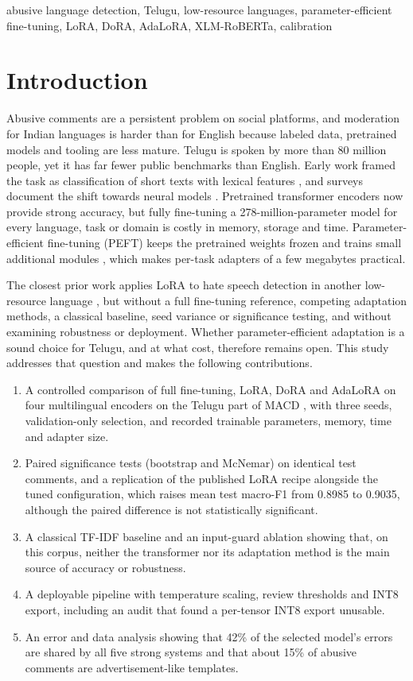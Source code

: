 \documentclass[conference]{IEEEtran}
\begin{document}
\begin{IEEEkeywords}
abusive language detection, Telugu, low-resource languages, parameter-efficient fine-tuning, LoRA, DoRA, AdaLoRA, XLM-RoBERTa, calibration
\end{IEEEkeywords}

\section{Introduction}
Abusive comments are a persistent problem on social platforms, and moderation for Indian languages is harder than for English because labeled data, pretrained models and tooling are less mature. Telugu is spoken by more than 80 million people, yet it has far fewer public benchmarks than English. Early work framed the task as classification of short texts with lexical features \cite{waseem2016,davidson2017}, and surveys document the shift towards neural models \cite{schmidt2017}. Pretrained transformer encoders \cite{vaswani2017,devlin2019bert} now provide strong accuracy, but fully fine-tuning a 278-million-parameter model for every language, task or domain is costly in memory, storage and time. Parameter-efficient fine-tuning (PEFT) keeps the pretrained weights frozen and trains small additional modules \cite{houlsby2019,hu2022lora}, which makes per-task adapters of a few megabytes practical.

The closest prior work applies LoRA to hate speech detection in another low-resource language \cite{kaunang2026indo}, but without a full fine-tuning reference, competing adaptation methods, a classical baseline, seed variance or significance testing, and without examining robustness or deployment. Whether parameter-efficient adaptation is a sound choice for Telugu, and at what cost, therefore remains open. This study addresses that question and makes the following contributions.
\begin{enumerate}
\item A controlled comparison of full fine-tuning, LoRA, DoRA and AdaLoRA on four multilingual encoders on the Telugu part of MACD \cite{gupta2022macd}, with three seeds, validation-only selection, and recorded trainable parameters, memory, time and adapter size.
\item Paired significance tests (bootstrap and McNemar) on identical test comments, and a replication of the published LoRA recipe \cite{kaunang2026indo} alongside the tuned configuration, which raises mean test macro-F1 from 0.8985 to 0.9035, although the paired difference is not statistically significant.
\item A classical TF-IDF baseline and an input-guard ablation showing that, on this corpus, neither the transformer nor its adaptation method is the main source of accuracy or robustness.
\item A deployable pipeline with temperature scaling, review thresholds and INT8 export, including an audit that found a per-tensor INT8 export unusable.
\item An error and data analysis showing that 42\% of the selected model's errors are shared by all five strong systems and that about 15\% of abusive comments are advertisement-like templates.
\end{enumerate}
\end{document}
